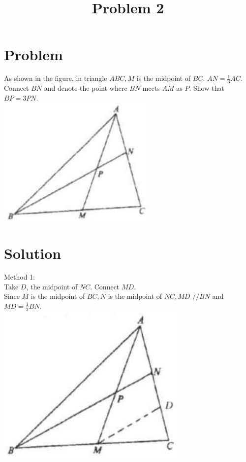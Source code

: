 \documentclass{article}
\title{Problem 2}
\date{}
\begin{document}
\maketitle

\section*{Problem}
As shown in the figure, in triangle \(A B C, M\) is the midpoint of \(B C\). \(A N=\frac{1}{3} A C\). Connect \(B N\) and denote the point where \(B N\) meets \(A M\) as \(P\). Show that \(B P=3 P N\).\\
\centering
\includegraphics[width=\textwidth]{images/044.jpg}

\section*{Solution}
Method 1:\\
Take \(D\), the midpoint of \(N C\). Connect \(M D\).\\
Since \(M\) is the midpoint of \(B C, N\) is the midpoint of \(N C, M D\) \(/ / B N\) and \(M D=\frac{1}{2} B N\).\\
\centering
\includegraphics[width=\textwidth]{images/047.jpg}
\end{document}
